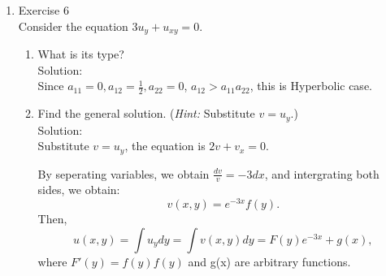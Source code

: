 \documentclass[12pt]{article}%
\begin{document}
\begin{enumerate}
\begin{enumerate}
\begin{enumerate}
            
        \end{enumerate}
        \item Exercise 6 \smallskip \\
        Consider the equation $3u_y + u_{xy} =0$.
        \begin{enumerate}
            \item What is its type? \smallskip \\
        Solution:\\
        Since $a_{11}=0,a_{12}=\frac{1}{2},a_{22}=0$, $a_{12}>a_{11}a_{22}$, this is Hyperbolic case.
            
            \item Find the general solution. (\emph{Hint:} Substitute $v = u_y$.) \smallskip \\
            Solution:\\
            Substitute $v = u_y$, the equation is $2v+v_{x}=0$. 
            
            By seperating variables, we obtain $\frac{dv}{v}=-3dx$, and intergrating both sides,
            we obtain:
            \[v(x,y)=e^{-3x}f(y).\]
            Then, \[u(x,y)=\int u_{y}dy= \int v(x,y) dy= F(y)e^{-3x}+g(x),\]  where $F'(y)=f(y)f(y)$ and g(x) are arbitrary functions.
            

\end{enumerate}
\end{enumerate}
\end{enumerate}
\end{document}
